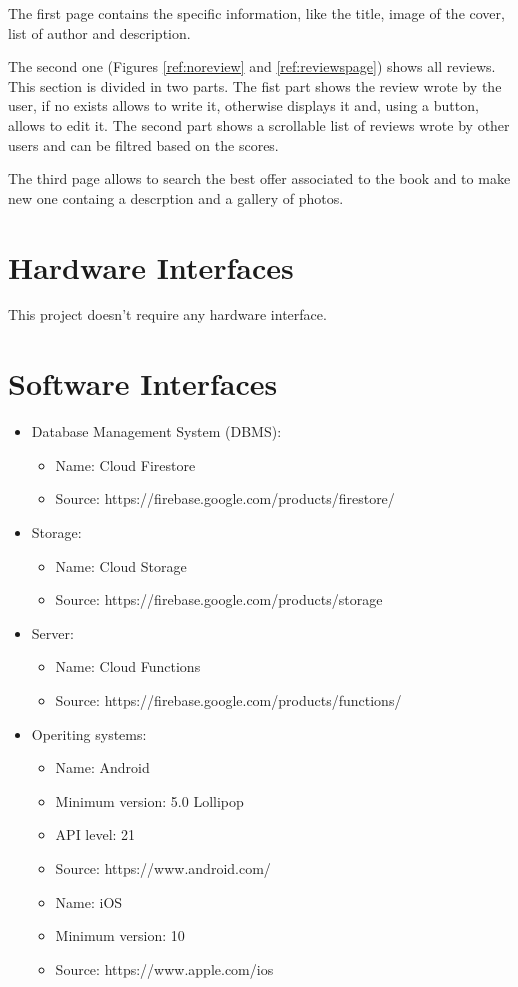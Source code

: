 The first page contains the specific information, like the title, image of the cover, list of author and description.

The second one (Figures \ref{ref:noreview} and \ref{ref:reviewspage}) shows all reviews. This section is divided in two parts.
The fist part shows the review wrote by the user, if no exists allows to write it, otherwise displays it and, using a button, allows to edit it.
The second part shows a scrollable list of reviews wrote by other users and can be filtred based on the scores.

The third page allows to search the best offer associated to the book and to make new one containg a descrption and a gallery of photos.
\clearpage
\section{Hardware Interfaces}
This project doesn’t require any hardware interface.
\section{Software Interfaces}
\begin{itemize}
    \item Database Management System (DBMS):
    \begin{itemize}
        \item 
        Name: Cloud Firestore
        \item 
        Source: https://firebase.google.com/products/firestore/
    \end{itemize}
    \item Storage:
    \begin{itemize}
        \item 
        Name: Cloud Storage
        \item 
        Source: https://firebase.google.com/products/storage
    \end{itemize}
    \item Server:
    \begin{itemize}
        \item 
        Name: Cloud Functions
        \item 
        Source: https://firebase.google.com/products/functions/
    \end{itemize}
    \item
    Operiting systems:
    \begin{itemize}
        \item 
        Name: Android
        \item 
        Minimum version: 5.0 Lollipop 
        \item 
        API level: 21
        \item 
        Source: https://www.android.com/
        \newline
        \item 
        Name: iOS
        \item 
        Minimum version: 10
        \item 
        Source: https://www.apple.com/ios
    \end{itemize}
\end{itemize}
